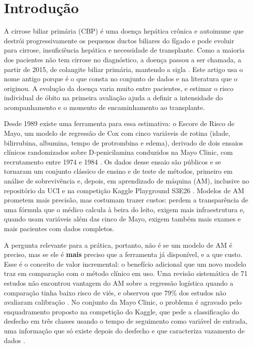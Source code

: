\section{Introdução}\label{sec:introducao}

A cirrose biliar primária (CBP) é uma doença hepática crônica e autoimune que destrói progressivamente os pequenos ductos biliares do fígado e pode evoluir para cirrose, insuficiência hepática e necessidade de transplante. Como a maioria dos pacientes não tem cirrose no diagnóstico, a doença passou a ser chamada, a partir de 2015, de colangite biliar primária, mantendo a sigla \cite{beuers2015nomenclature}. Este artigo usa o nome antigo porque é o que consta no conjunto de dados e na literatura que o originou. A evolução da doença varia muito entre pacientes, e estimar o risco individual de óbito na primeira avaliação ajuda a definir a intensidade do acompanhamento e o momento de encaminhamento ao transplante.

Desde 1989 existe uma ferramenta para essa estimativa: o Escore de Risco de Mayo, um modelo de regressão de Cox com cinco variáveis de rotina (idade, bilirrubina, albumina, tempo de protrombina e edema), derivado de dois ensaios clínicos randomizados sobre D-penicilamina conduzidos na Mayo Clinic, com recrutamento entre 1974 e 1984 \cite{dickson1989prognosis}. Os dados desse ensaio são públicos e se tornaram um conjunto clássico de ensino e de teste de métodos, primeiro em análise de sobrevivência \cite{fleming1991counting} e, depois, em aprendizado de máquina (AM), inclusive no repositório da UCI \cite{uci878} e na competição Kaggle Playground S3E26 \cite{reade2023ps3e26}. Modelos de AM prometem mais precisão, mas costumam trazer custos: perdem a transparência de uma fórmula que o médico calcula à beira do leito, exigem mais infraestrutura e, quando usam variáveis além das cinco de Mayo, exigem também mais exames e mais pacientes com dados completos.

A pergunta relevante para a prática, portanto, não é se um modelo de AM é preciso, mas se ele é \textbf{mais} preciso que a ferramenta já disponível, e a que custo. Esse é o conceito de valor incremental: o benefício adicional que um novo modelo traz em comparação com o método clínico em uso. Uma revisão sistemática de 71 estudos não encontrou vantagem do AM sobre a regressão logística quando a comparação tinha baixo risco de viés, e observou que 79\% dos estudos não avaliaram calibração \cite{christodoulou2019systematic}. No conjunto da Mayo Clinic, o problema é agravado pelo enquadramento proposto na competição do Kaggle, que pede a classificação do desfecho em três classes usando o tempo de seguimento como variável de entrada, uma informação que só existe depois do desfecho e que caracteriza vazamento de dados \cite{kapoor2023leakage}.

